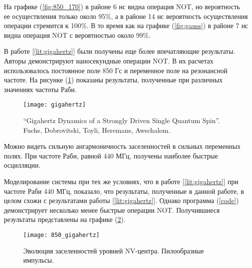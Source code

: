На графике (\ref{fig:850_170}) в районе 6 нс видна операция NOT, но
вероятность ее осуществления только около 95\%, а в районе 14 нс
вероятность осуществления операции стремится к 100\%. В то время как
на графике (\ref{fig:gauss}) в районе 7 нс видна операция NOT с
вероятностью около 99\%.

В работе [\ref{lit:gigahertz}] были получены еще более впечатляющие
результаты. Авторы демонстрируют наносекундные операции NOT. В их
расчетах использовалось постоянное поле 850 Гс и переменное поле на
резонансной частоте. На рисунке (\ref{fig:gigahertz}) показаны
результаты, полученные при различных значениях частоты Раби.
\begin{figure}[H]\centering
  \texttt{[image: gigahertz]}
  \caption{``Gigahertz Dynamics of a Strongly Driven Single Quantum
  Spin''. Fuchs, Dobrovitski, Toyli, Heremans, Awschalom.}\label{fig:gigahertz}
\end{figure}

Можно видеть сильную ангармоничность заселенностей в сильных
переменных полях. При частоте Раби, равной 440 МГц, получены наиболее
быстрые осцилляции.

Моделирование системы при тех же условиях, что в работе
[\ref{lit:gigahertz}] при частоте Раби 440 МГц, показало, что
результаты, полученные в данной работе, в целом схожи с результатами
работы [\ref{lit:gigahertz}]. Однако программа (\ref{code})
демонстрирует несколько менее быстрые операции NOT. Получившиеся результаты представлены на
графике (\ref{fig:850_gigahertz}).
\begin{figure}[H]\centering
  \texttt{[image: 850\_gigahertz]}
  \caption{Эволюция заселенностей уровней NV-центра. Пилообразные импульсы.}\label{fig:850_gigahertz}
\end{figure}

